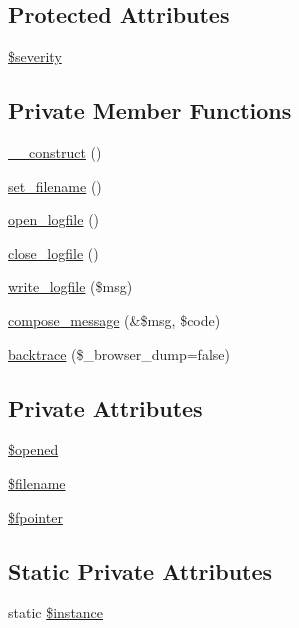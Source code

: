 \subsection*{Protected Attributes}
\begin{DoxyCompactItemize}
\item 
\hyperlink{class__OWL_ad26b40a9dbbacb33e299b17826f8327c}{\$severity}
\end{DoxyCompactItemize}
\subsection*{Private Member Functions}
\begin{DoxyCompactItemize}
\item 
\hyperlink{classLogHandler_aacca49c4394109f4ccc494048a0b2cab}{\_\-\_\-construct} ()
\item 
\hyperlink{classLogHandler_a65ef4f1c6ab4cff4057f5f5932cc690e}{set\_\-filename} ()
\item 
\hyperlink{classLogHandler_aaf324e5156bf8ea83e5b4e990ea99e2d}{open\_\-logfile} ()
\item 
\hyperlink{classLogHandler_a1a3b03d9bb97404a4f746bd2aacc5a8c}{close\_\-logfile} ()
\item 
\hyperlink{classLogHandler_ae0cd68fb6f068e47f899a1e4c7f29ba9}{write\_\-logfile} (\$msg)
\item 
\hyperlink{classLogHandler_ad32511521115b21779d699c836197dd0}{compose\_\-message} (\&\$msg, \$code)
\item 
\hyperlink{classLogHandler_aaf2175a042c4c0f1e26f885c576bc304}{backtrace} (\$\_\-browser\_\-dump=false)
\end{DoxyCompactItemize}
\subsection*{Private Attributes}
\begin{DoxyCompactItemize}
\item 
\hyperlink{classLogHandler_a956e7e71a9ff96c6301d1f41a5bf207e}{\$opened}
\item 
\hyperlink{classLogHandler_ab51c12bcd654093b9d0153ab38ebad8c}{\$filename}
\item 
\hyperlink{classLogHandler_ad65c8954bda40d8a33828f0a0a2cbf5b}{\$fpointer}
\end{DoxyCompactItemize}
\subsection*{Static Private Attributes}
\begin{DoxyCompactItemize}
\item 
static \hyperlink{classLogHandler_a1907cf33534c0b1100fa593c12bcfb6e}{\$instance}
\end{DoxyCompactItemize}


